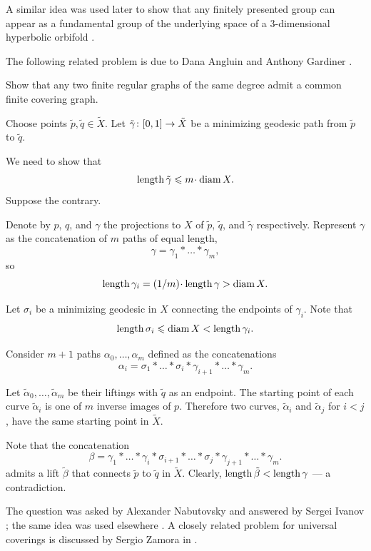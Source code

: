 A similar idea was used later to show that any finitely presented group can appear as a fundamental group of the underlying space of a 3-dimensional hyperbolic orbifold \cite{panov-petrunin-telescopic}.

The following related problem is due to Dana Angluin and Anthony Gardiner \cite{angluin-gardiner}.

\begin{pr}
Show that any two finite regular graphs of the same degree admit a common finite covering graph.
\end{pr}

Choose points $\tilde p,\tilde q\in\tilde X$.
Let  
$\tilde\gamma\:[0,1]\z\to \tilde X$ be a minimizing geodesic path from $\tilde p$ to $\tilde q$.

We need to show that 
\[\length \tilde\gamma\le m\cdot \diam X.\]
Suppose the contrary.

Denote by $p$, $q$, and $\gamma$ the projections to $X$ of $\tilde p$, $\tilde q$, and $\tilde \gamma$ respectively.
Represent $\gamma$
as the concatenation of $m$ paths of equal length,
\[\gamma=\gamma_1{*}\ldots{*}\gamma_m,\]
so
\[\length\gamma_i=\tfrac{1}m\cdot\length\gamma>\diam X.\]

Let $\sigma_i$ be a minimizing geodesic in $X$ connecting the endpoints of $\gamma_i$.
Note that 
\[\operatorname{\rm length}\sigma_i\leqslant \operatorname{\rm diam}\nolimits X< \operatorname{\rm length}\gamma_i.\]

Consider $m+1$ paths $\alpha_0,\ldots,\alpha_m$ defined as the concatenations
\[\alpha_i=\sigma_1{*}\ldots{*}\sigma_i{*}\gamma_{i+1}{*}\ldots{*}\gamma_m.\]

Let $\tilde\alpha_0,\ldots,\tilde\alpha_m$ be their liftings
with $\tilde q$ as an endpoint.
The starting point of each curve $\tilde\alpha_i$ is one of $m$ inverse images of $p$. 
Therefore two curves, $\tilde\alpha_i$ and $\tilde\alpha_j$ for $i<j$, 
have the same starting point in $\tilde X$.

Note that the concatenation
\[\beta=\gamma_1{*}\ldots{*}\gamma_i{*}\sigma_{i+1}{*}\ldots{*}\sigma_j{*}\gamma_{j+1}{*}\ldots{*}\gamma_m.\]
admits a lift $\tilde\beta$ that connects $\tilde p$ to $\tilde q$ in $\tilde X$.
Clearly, $\operatorname{\rm length} \tilde\beta<\operatorname{\rm length} \gamma$ --- a contradiction.
\qeds

The question was asked by Alexander Nabutovsky
and answered by Sergei Ivanov \cite{ivanov};
the same idea was used elsewhere \cite[see ``Red and blue dice'' in][and the references therein]{winkler2007}.
A closely related problem for universal coverings is discussed by Sergio Zamora in \cite{zamora}.

